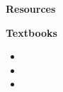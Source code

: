 \begin{frame}\begin{center}
		\LARGE\textbf{Resources}
\end{center}\end{frame}
\begin{frame}\textbf{Textbooks}\vspace{0.3cm}

\begin{itemize}\small
\item {}
\item {}
\item {}
\end{itemize}

\end{frame}
